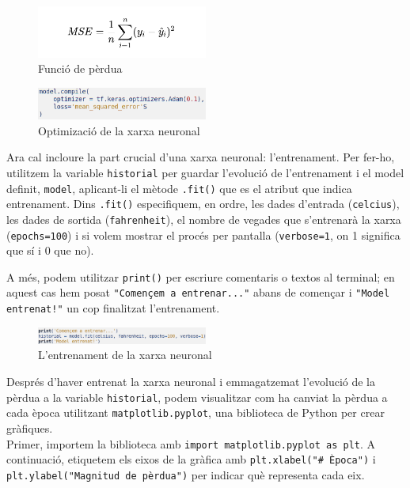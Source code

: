\begin{figure}[H]
    \centering
    \includegraphics[width=0.5\textwidth]{./figures/5.png}
    \caption{Funció de pèrdua}
\end{figure}


\begin{figure}[H]
    \centering
    \includegraphics[width=0.5\textwidth]{./figures/4.png}
    \caption{Optimizació de la xarxa neuronal}
\end{figure}

Ara cal incloure la part crucial d'una xarxa neuronal: l'entrenament. Per fer-ho, utilitzem la variable \texttt{historial} per guardar l'evolució de l'entrenament i el model definit, \texttt{model}, aplicant-li el mètode \texttt{.fit()} que es el atribut que indica entrenament. Dins \texttt{.fit()} especifiquem, en ordre, les dades d'entrada (\texttt{celcius}), les dades de sortida (\texttt{fahrenheit}), el nombre de vegades que s'entrenarà la xarxa (\texttt{epochs=100}) i si volem mostrar el procés per pantalla (\texttt{verbose=1}, on 1 significa que sí i 0 que no).

A més, podem utilitzar \texttt{print()} per escriure comentaris o textos al terminal; en aquest cas hem posat \texttt{"Començem a entrenar..."} abans de començar i \texttt{"Model entrenat!"} un cop finalitzat l'entrenament.

\begin{figure}[H]
    \centering
    \includegraphics[width=0.5\textwidth]{./figures/6.png}
    \caption{L'entrenament de la xarxa neuronal}
\end{figure}
\label{matplotlib}
Després d’haver entrenat la xarxa neuronal i emmagatzemat l’evolució de la pèrdua a la variable \texttt{historial}, podem visualitzar com ha canviat la pèrdua a cada època utilitzant \texttt{matplotlib.pyplot}, una biblioteca de Python per crear gràfiques.\\

Primer, importem la biblioteca amb \texttt{import matplotlib.pyplot as plt}. A continuació, etiquetem els eixos de la gràfica amb \texttt{plt.xlabel("\# Època")} i \texttt{plt.ylabel("Magnitud de pèrdua")} per indicar què representa cada eix.\\

